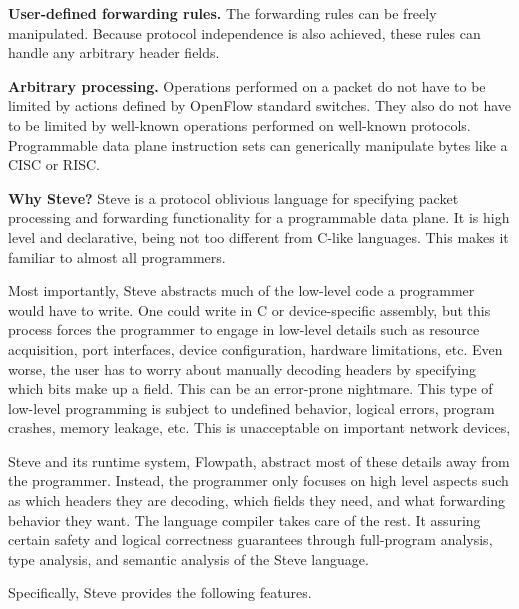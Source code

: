 \textbf{User-defined forwarding rules.} The forwarding rules can be freely manipulated. Because protocol independence is also achieved, these rules can handle any arbitrary header fields. 

\textbf{Arbitrary processing.} Operations performed on a packet do not have to be limited by actions defined by OpenFlow standard switches. They also do not have to be limited by well-known operations performed on well-known protocols. Programmable data plane instruction sets can generically manipulate bytes like a CISC or RISC.

\textbf{Why Steve?} Steve is a protocol oblivious language for specifying packet processing and forwarding functionality for a programmable data plane. It is high level and declarative, being not too different from C-like languages. This makes it familiar to almost all programmers.

Most importantly, Steve abstracts much of the low-level code a programmer would have to write. One could write in C or device-specific assembly, but this process forces the programmer to engage in low-level details such as resource acquisition, port interfaces, device configuration, hardware limitations, etc. Even worse, the user has to worry about manually decoding headers by specifying which bits make up a field. This can be an error-prone nightmare. This type of low-level programming is subject to undefined behavior, logical errors, program crashes, memory leakage, etc. This is unacceptable on important network devices,

Steve and its runtime system, Flowpath, abstract most of these details away from the programmer. Instead, the programmer only focuses on high level aspects such as which headers they are decoding, which fields they need, and what forwarding behavior they want. The language compiler takes care of the rest. It assuring certain safety and logical correctness guarantees through full-program analysis, type analysis, and semantic analysis of the Steve language.

Specifically, Steve provides the following features.

